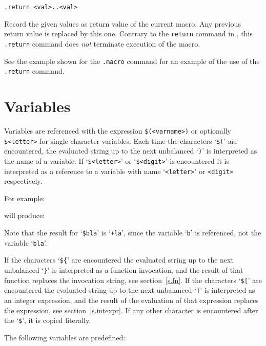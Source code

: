\begin{verbatim}
.return <val>..<val>
\end{verbatim}
\begin{desc}
Record the given values as return value of the current macro.
Any previous return value is replaced by this one.
Contrary to the {\tt return} command in {\C}, this \verb+.return+
command does {\em not} terminate execution of the macro.
\par
See the example shown for the \verb'.macro' command for an example of the
use of the \verb'.return' command.
\end{desc}
\section{Variables}
Variables are referenced with the expression
{\tt \$(<varname>)} or optionally {\tt \$<letter>} for single character
variables.
Each time the characters `{\tt \$(}' are encountered,
the evaluated string up to the next unbalanced `{\tt )}' 
is interpreted as the name of a variable.
If `{\tt \$<letter>}' or `{\tt \$<digit>}' is encountered it is interpreted as
a reference to a variable with name `{\tt <letter>}' or {\tt <digit>}
respectively.
\par
For example:
\begin{showfile}

\end{showfile}
will produce:
\begin{showfile}

\end{showfile}
Note that the result for `\verb+$bla+' is `{\tt +la}', since the
variable `{\tt b}' is referenced, not the variable `{\tt bla}'.
\par
If the characters `{\tt \$\{}' are encountered the evaluated string up to
the next unbalanced `{\tt \}}' is interpreted as a function invocation,
and the result of that function replaces the invocation string,
see section~\ref{s.fn}.
If the characters `{\tt \$[}' are encountered the evaluated string up
to the next unbalanced `{\tt ]}' is interpreted as an integer expression,
and the result of the evaluation of that expression replaces the expression,
see section~\ref{s.intexpr}.
If any other character is encountered after the `{\tt \$}',
it is copied literally.
\par
The following variables are predefined:
\par
